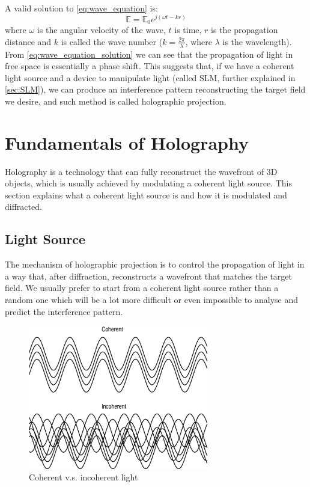 A valid solution to \cref{eq:wave_equation} is:
\begin{equation}
  \mathbb{E} = \mathbb{E}_0 e^{j(\omega t - k r)} \label{eq:wave_equation_solution}
\end{equation}
where $\omega$ is the angular velocity of the wave, $t$ is time, $r$ is the propagation distance and $k$ is called the wave number ($k=\frac{2\pi}{\lambda}$, where $\lambda$ is the wavelength). From \cref{eq:wave_equation_solution} we can see that the propagation of light in free space is essentially a phase shift. This suggests that, if we have a coherent light source and a device to manipulate light (called SLM, further explained in \cref{sec:SLM}), we can produce an interference pattern reconstructing the target field we desire, and such method is called holographic projection.


\newpage
\section{Fundamentals of Holography}
Holography is a technology that can fully reconstruct the wavefront of 3D objects, which is usually achieved by modulating a coherent light source. This section explains what a coherent light source is and how it is modulated and diffracted.

\subsection{Light Source} \label{sec:Light Source}

The mechanism of holographic projection is to control the propagation of light in a way that, after diffraction, reconstructs a wavefront that matches the target field. We usually prefer to start from a coherent light source rather than a random one which will be a lot more difficult or even impossible to analyse and predict the interference pattern.

\begin{figure}[H]
	\centering
	\includegraphics[width=0.7\textwidth]{coherent-vs-incoherent.eps}
	\caption{Coherent v.s. incoherent light}
	\label{fig:coherent-vs-incoherent.eps}
\end{figure}

